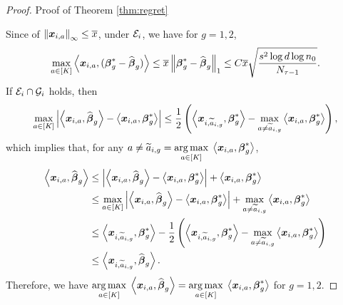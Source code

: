 \begin{proof}{Proof of Theorem \ref{thm:regret}}
	
	Since of $\norm{\bx_{i,a}}_{\infty} \leq \overline{x}$, under $\cE_i$, we have for $g=1,2$,
	\[\max_{a \in [K]}\angles{\bx_{i,a}, (\bbeta_g^* - \hat \bbeta_g)} \leq \overline{x}\norm{\bbeta_g^* - \hat \bbeta_g}_1 \leq C\overline{x}\sqrt{\frac{s^2\log d  \log n_0}{N_{\tau-1}}}.\]
	If $\cE_i\cap\cG_i$ holds, then
	\[\max\limits_{a\in [K]}\abs{\angles{\bx_{i,a}, \hat \bbeta_{g}} - \angles{\bx_{i,a}, \bbeta^*_{g}}} \leq \frac{1}{2}\left( \angles{\bx_{i, \tilde{a}_{i, g}}, \bbeta_g^*} - \max_{a\ne \tilde{a}_{i, g}}\angles{\bx_{i, a}, \bbeta^*_{g}}\right),\]
	which implies that, for any $a \neq \tilde{a}_{i, g}= \underset{a\in [K]}{\arg \max}\; \angles{\bx_{i,a}, \bbeta^*_{g}}$,
	\begin{equation}
		\begin{aligned}
			\angles{\bx_{i, a}, \hat\bbeta_{g}} & \leq \abs{\angles{\bx_{i,a}, \hat \bbeta_{g}} - \angles{\bx_{i,a}, \bbeta^*_{g}}}  + \angles{\bx_{i, a}, \bbeta^*_{g}}	\\
			&\leq \max\limits_{a\in [K]}\abs{\angles{\bx_{i,a}, \hat \bbeta_{g}} - \angles{\bx_{i,a}, \bbeta^*_{g}}}  +\max_{a\ne \tilde{a}_{i, g}}\angles{\bx_{i, a}, \bbeta^*_{g}}\\
			& \leq \angles{\bx_{i, \tilde{a}_{i, g}}, \bbeta_g^*}-\frac{1}{2}\left( \angles{\bx_{i, \tilde{a}_{i, g}}, \bbeta_g^*} - \max_{a\ne \tilde{a}_{i, g}}\angles{\bx_{i, a}, \bbeta^*_{g}}\right)\\
			& \leq  \angles{\bx_{i, \tilde{a}_{i, g}}, \hat{\bbeta}_g}.
		\end{aligned}
	\end{equation}
	Therefore, we have $\underset{a\in [K]}{\arg \max}\; \angles{\bx_{i,a}, \hat\bbeta_{g}}=\underset{a\in [K]}{\arg \max}\; \angles{\bx_{i,a}, \bbeta^*_{g}}$ for $g=1,2$.


\end{proof}

